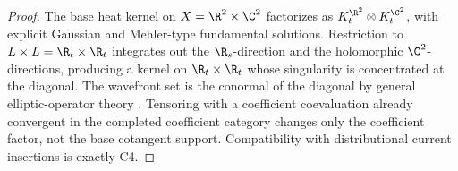 \begin{proof}
The base heat kernel on \(X=\R^2\times\C^2\) factorizes as
\(K_t^{\R^2}\otimes K_t^{\C^2}\), with explicit Gaussian and
Mehler-type fundamental solutions.  Restriction to
\(L\times L=\R_t\times\R_t\) integrates
out the \(\R_s\)-direction and the holomorphic \(\C^2\)-directions,
producing a kernel on \(\R_t\times\R_t\) whose singularity is
concentrated at the diagonal.  The wavefront set is the conormal
of the diagonal by general elliptic-operator theory
\cite{hormander-vol1}.  Tensoring with a coefficient coevaluation
already convergent in the completed coefficient category changes only
the coefficient factor, not the base cotangent support.  Compatibility
with distributional current insertions is exactly C4.
\end{proof}

